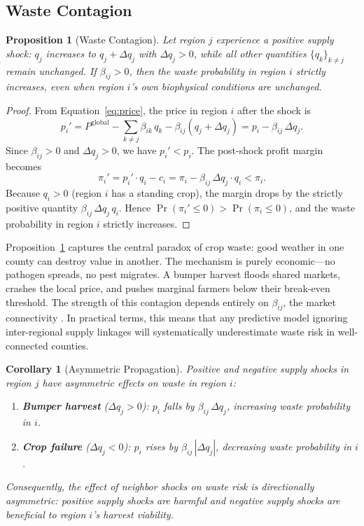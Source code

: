 \documentclass[preprint,12pt,authoryear]{elsarticle}
\newtheorem{proposition}{Proposition}
\newtheorem{corollary}{Corollary}
\begin{document}
\subsection{Waste Contagion}

\begin{proposition}[Waste Contagion]
\label{prop:contagion}
Let region $j$ experience a positive supply shock: $q_j$ increases to $q_j + \Delta q_j$ with $\Delta q_j > 0$, while all other quantities $\{q_k\}_{k \neq j}$ remain unchanged.
If $\beta_{ij} > 0$, then the waste probability in region $i$ strictly increases, even when region $i$'s own biophysical conditions are unchanged.
\end{proposition}

\begin{proof}
From Equation~\eqref{eq:price}, the price in region $i$ after the shock is
\[
p_i' = P^{\mathrm{global}} - \sum_{k \neq j} \beta_{ik}\, q_k - \beta_{ij}(q_j + \Delta q_j) = p_i - \beta_{ij}\, \Delta q_j.
\]
Since $\beta_{ij} > 0$ and $\Delta q_j > 0$, we have $p_i' < p_i$.
The post-shock profit margin becomes
\[
\pi_i' = p_i' \cdot q_i - c_i = \pi_i - \beta_{ij}\, \Delta q_j \cdot q_i < \pi_i.
\]
Because $q_i > 0$ (region $i$ has a standing crop), the margin drops by the strictly positive quantity $\beta_{ij}\, \Delta q_j \, q_i$.
Hence $\Pr(\pi_i' \leq 0) > \Pr(\pi_i \leq 0)$, and the waste probability in region $i$ strictly increases.
\end{proof}

Proposition~\ref{prop:contagion} captures the central paradox of crop waste: good weather in one county can destroy value in another.
The mechanism is purely economic---no pathogen spreads, no pest migrates.
A bumper harvest floods shared markets, crashes the local price, and pushes marginal farmers below their break-even threshold.
The strength of this contagion depends entirely on $\beta_{ij}$, the market connectivity \citep{acemoglu2015systemic}. In practical terms, this means that any predictive model ignoring inter-regional supply linkages will systematically underestimate waste risk in well-connected counties.

\begin{corollary}[Asymmetric Propagation]
\label{cor:asymmetry}
Positive and negative supply shocks in region $j$ have asymmetric effects on waste in region $i$:
\begin{enumerate}[label=(\alph*)]
    \item \textbf{Bumper harvest} ($\Delta q_j > 0$): $p_i$ falls by $\beta_{ij}\, \Delta q_j$, \emph{increasing} waste probability in $i$.
    \item \textbf{Crop failure} ($\Delta q_j < 0$): $p_i$ rises by $\beta_{ij}\, |\Delta q_j|$, \emph{decreasing} waste probability in $i$.
\end{enumerate}
Consequently, the effect of neighbor shocks on waste risk is directionally asymmetric: positive supply shocks are harmful and negative supply shocks are beneficial to region $i$'s harvest viability.
\end{corollary}
\end{document}

